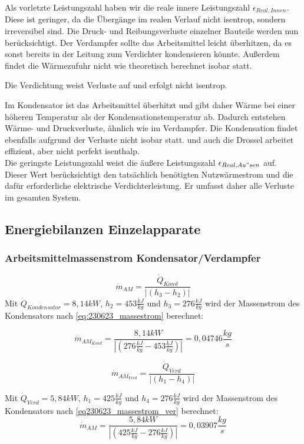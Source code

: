 Als vorletzte Leistungszahl haben wir die reale innere Leistungszahl $\epsilon_{Real,Innen}$.
Diese ist geringer, da die Übergänge im realen Verlauf nicht isentrop, sondern irreversibel sind. 
Die Druck- und Reibungsverluste einzelner Bauteile werden nun berücksichtigt. 
Der Verdampfer sollte das Arbeitsmittel leicht überhitzen, da es sonst bereits in der Leitung zum Verdichter kondensieren könnte. 
Außerdem findet die Wärmezufuhr nicht wie theoretisch berechnet isobar statt.

Die Verdichtung weist Verluste auf und erfolgt nicht isentrop.

Im Kondensator ist das Arbeitsmittel überhitzt und gibt daher Wärme bei einer höheren Temperatur als der Kondensationstemperatur ab. 
Dadurch entstehen Wärme- und Druckverluste, ähnlich wie im Verdampfer. 
Die Kondensation findet ebenfalls aufgrund der Verluste nicht isobar statt.
und auch die  Drossel arbeitet effizient, aber nicht perfekt isenthalp.
\\
Die geringste Leistungszahl weist die äußere Leistungszahl $\epsilon_{Real,Au"sen}$ auf. 
Dieser Wert berücksichtigt den tatsächlich benötigten Nutzwärmestrom und die dafür erforderliche elektrische Verdichterleistung. 
Er umfasst daher alle Verluste im gesamten System.


\subsection{Energiebilanzen Einzelapparate}
\label{subsec:Massenstrom}
\subsubsection{Arbeitsmittelmassenstrom Kondensator/Verdampfer}
\begin{equation}
   \dot m_{AM} = \frac{\dot Q_{Kond}}{|(h_3 - h_2)|}
   \label{eq:230623_massestrom}
\end{equation}
Mit $\dot Q_{Kondensator}=8,14kW$, $h_2=453\frac{kJ}{kg}$ und $h_3=276\frac{kJ}{kg}$ wird der Massenstrom des Kondensators nach \autoref*{eq:230623_massestrom} berechnet:

$$ \dot m_{AM_{Kond}} = \frac{8,14kW}{|(276\frac{kJ}{kg} - 453\frac{kJ}{kg})|} = 0,04746 \frac{kg}{s} $$

\begin{equation}
  \dot m_{AM_{Verd}} = \frac{\dot Q_{Verd}}{|(h_1-h_4)|}
    \label{eq230623_massestrom_ver}
\end{equation}

Mit $\dot Q_{Verd}=5,84kW$, $h_1=425\frac{kJ}{kg}$ und $h_4=276\frac{kJ}{kg}$ wird der Massenstrom des Kondensators nach \autoref*{eq230623_massestrom_ver} berechnet:
$$\dot m_{AM} = \frac{5,84 kW}{|(425\frac{kJ}{kg}-276\frac{kJ}{kg})|} = 0,03907 \frac{kg}{s}$$

